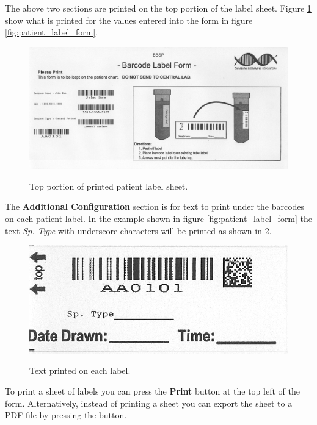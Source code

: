 The above two sections are printed on the top portion of the label
sheet. Figure \ref{fig:printed_sheet_top} show what is printed for the values
entered into the form in figure \ref{fig:patient_label_form}.

\begin{figure}[H]
  \centering
  \scalebox{0.6}
	   { \includegraphics*{screenshots/printer_labels/04_printed_patient_labels_top} }
	   \caption{Top portion of printed patient label sheet.}
	   \label{fig:printed_sheet_top}
\end{figure}

The \textbf{Additional Configuration} section is for text to print under the
barcodes on each patient label. In the example shown in figure
\ref{fig:patient_label_form} the text \emph{Sp. Type} with underscore
characters will be printed as shown in \ref{fig:sp_type_single_label}.

\begin{figure}[H]
  \centering
  \scalebox{1.0}
	   { \includegraphics*{screenshots/printer_labels/05_single_label} }
	   \caption{Text printed on each label.}
	   \label{fig:sp_type_single_label}
\end{figure}

To print a sheet of labels you can press the \textbf{Print} button at the top
left of the form. Alternatively, instead of printing a sheet you can export the
sheet to a PDF file by pressing the  button.

